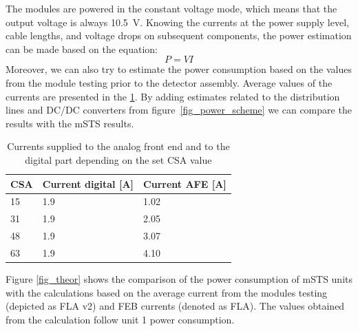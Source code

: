 The modules are powered in the constant voltage mode, which means that the output voltage is always 10.5~V. Knowing the currents at the power supply level, cable lengths, and voltage drops on subsequent components, the power estimation can be made based on the equation:
\begin{equation}
    P = VI
\end{equation}
Moreover, we can also try to estimate the power consumption based on the values from the module testing prior to the detector assembly. Average values of the currents are presented in the \ref{tab:typical_cons}. By adding estimates related to the distribution lines and DC/DC converters from figure~\ref{fig_power_scheme} we can compare the results with the \gls{mSTS} results. 
\begin{table}[!h]
\centering
\begin{tabular}{lll}
\hline
CSA & Current digital {[}A{]} & Current \gls{AFE} {[}A{]} \\ \hline
15  & 1.9                 & 1.02                    \\
31  & 1.9                 & 2.05                    \\
48  & 1.9                 & 3.07                    \\
63  & 1.9                 & 4.10                    \\ \hline
\end{tabular}
\caption{Currents supplied to the analog front end and to the digital part depending on the set \gls{CSA} value}
\label{tab:typical_cons}
\end{table}
\newpage
Figure \ref{fig_theor} shows the comparison of the power consumption of \gls{mSTS} units with the calculations based on the average current from the modules testing (depicted as FLA v2) and FEB currents (denoted as FLA). The values obtained from the calculation follow unit 1 power consumption. 

